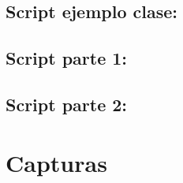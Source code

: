 \documentclass[10pt,executivepaper]{article}
\begin{document}
\subsection{Script ejemplo clase:}

\subsection{Script parte 1:}

\subsection{Script parte 2:}

\section{Capturas}
\end{document}
